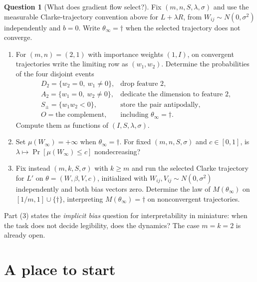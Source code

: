 \documentclass[11pt]{amsart}
\theoremstyle{plain}
\theoremstyle{definition}
\newtheorem{question}[theorem]{Question}
\begin{document}
\begin{question}[What does gradient flow select?]\label{q:dynamics}
Fix $(m,n,S,\lambda,\sigma)$ and use the measurable Clarke-trajectory convention above for $L+\lambda R$, from $W_{ij}\sim N(0,\sigma^2)$ independently and $b=0$. Write $\theta_\infty=\dagger$ when the selected trajectory does not converge.
\begin{enumerate}
\item For $(m,n)=(2,1)$ with importance weights $(1,I)$, on convergent trajectories write the limiting row as $(w_1,w_2)$. Determine the probabilities of the four disjoint events
\[
\begin{array}{ll}
D_2=\{w_2=0,\ w_1\ne0\}, & \text{drop feature 2},\\
A_2=\{w_1=0,\ w_2\ne0\}, & \text{dedicate the dimension to feature 2},\\
S_{\pm}=\{w_1w_2<0\}, & \text{store the pair antipodally},\\
O=\text{the complement}, & \text{including }\theta_\infty=\dagger.
\end{array}
\]
Compute them as functions of $(I,S,\lambda,\sigma)$.
\item Set $\mu(W_\infty)=+\infty$ when $\theta_\infty=\dagger$. For fixed $(m,n,S,\sigma)$ and $c\in[0,1]$, is $\lambda\mapsto \Pr[\mu(W_\infty)\le c]$ nondecreasing?
\item Fix instead $(m,k,S,\sigma)$ with $k\ge m$ and run the selected Clarke trajectory for $L'$ on $\theta=(W,\beta,V,c)$, initialized with $W_{ij},V_{ij}\sim N(0,\sigma^2)$ independently and both bias vectors zero. Determine the law of $M(\theta_\infty)$ on $[1/m,1]\cup\{\dagger\}$, interpreting $M(\theta_\infty)=\dagger$ on nonconvergent trajectories.
\end{enumerate}
\end{question}

Part (3) states the \emph{implicit bias} question for interpretability in miniature: when the task does not decide legibility, does the dynamics? The case $m=k=2$ is already open.

\section{A place to start}\label{sec:start}
\end{document}

